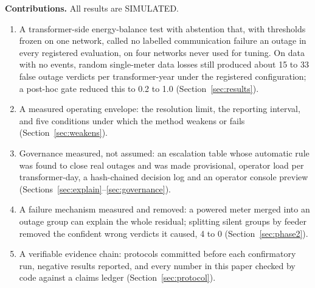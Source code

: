 \textbf{Contributions.} All results are SIMULATED.
\begin{enumerate}[leftmargin=1.4em]
\item A transformer-side energy-balance test with abstention that, with thresholds frozen on one
network, called no labelled communication failure an outage in every registered evaluation, on four
networks never used for tuning. On data with no events, random single-meter data losses still produced
about 15 to 33 false outage verdicts per transformer-year under the registered configuration; a post-hoc
gate reduced this to 0.2 to 1.0 (Section~\ref{sec:results}).
\item A measured operating envelope: the resolution limit, the reporting interval, and five conditions
under which the method weakens or fails (Section~\ref{sec:weakens}).
\item Governance measured, not assumed: an escalation table whose automatic rule was found to close
real outages and was made provisional, operator load per transformer-day, a hash-chained decision log
and an operator console preview (Sections~\ref{sec:explain}--\ref{sec:governance}).
\item A failure mechanism measured and removed: a powered meter merged into an outage group can
explain the whole residual; splitting silent groups by feeder removed the confident wrong verdicts it
caused, 4 to 0 (Section~\ref{sec:phase2}).
\item A verifiable evidence chain: protocols committed before each confirmatory run, negative results
reported, and every number in this paper checked by code against a claims ledger
(Section~\ref{sec:protocol}).
\end{enumerate}
